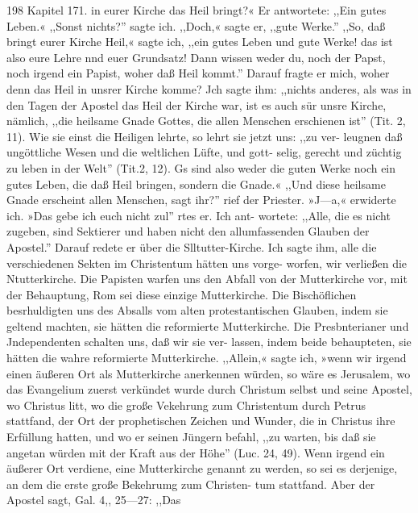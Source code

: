 198 Kapitel 171.
in eurer Kirche das Heil bringt?« Er antwortete: ,,Ein gutes
Leben.« ,,Sonst nichts?'' sagte ich. ,,Doch,« sagte er, ,,gute
Werke.'' ,,So, daß bringt eurer Kirche Heil,« sagte ich, ,,ein
gutes Leben und gute Werke! das ist also eure Lehre nnd euer
Grundsatz! Dann wissen weder du, noch der Papst, noch irgend
ein Papist, woher daß Heil kommt.'' Darauf fragte er mich,
woher denn das Heil in unsrer Kirche komme? Jch sagte ihm:
,,nichts anderes, als was in den Tagen der Apostel das Heil der
Kirche war, ist es auch sür unsre Kirche, nämlich, ,,die heilsame
Gnade Gottes, die allen Menschen erschienen ist'' (Tit. 2, 11).
Wie sie einst die Heiligen lehrte, so lehrt sie jetzt uns: ,,zu ver-
leugnen daß ungöttliche Wesen und die weltlichen Lüfte, und gott-
selig, gerecht und züchtig zu leben in der Welt'' (Tit.2, 12). Gs
sind also weder die guten Werke noch ein gutes Leben, die daß
Heil bringen, sondern die Gnade.« ,,Und diese heilsame Gnade
erscheint allen Menschen, sagt ihr?'' rief der Priester. »J—a,«
erwiderte ich. »Das gebe ich euch nicht zul'' rtes er. Ich ant-
wortete: ,,Alle, die es nicht zugeben, sind Sektierer und haben
nicht den allumfassenden Glauben der Apostel.''
Darauf redete er über die Slltutter-Kirche. Ich sagte ihm,
alle die verschiedenen Sekten im Christentum hätten uns vorge-
worfen, wir verließen die Ntutterkirche. Die Papisten warfen
uns den Abfall von der Mutterkirche vor, mit der Behauptung,
Rom sei diese einzige Mutterkirche. Die Bischöflichen besrhuldigten
uns des Absalls vom alten protestantischen Glauben, indem sie
geltend machten, sie hätten die reformierte Mutterkirche. Die
Presbnterianer und Jndependenten schalten uns, daß wir sie ver-
lassen, indem beide behaupteten, sie hätten die wahre reformierte
Mutterkirche. ,,Allein,« sagte ich, »wenn wir irgend einen äußeren
Ort als Mutterkirche anerkennen würden, so wäre es Jerusalem,
wo das Evangelium zuerst verkündet wurde durch Christum selbst
und seine Apostel, wo Christus litt, wo die große Vekehrung
zum Christentum durch Petrus stattfand, der Ort der prophetischen
Zeichen und Wunder, die in Christus ihre Erfüllung hatten, und
wo er seinen Jüngern befahl, ,,zu warten, bis daß sie angetan
würden mit der Kraft aus der Höhe'' (Luc. 24, 49). Wenn irgend ein
äußerer Ort verdiene, eine Mutterkirche genannt zu werden, so
sei es derjenige, an dem die erste große Bekehrumg zum Christen-
tum stattfand. Aber der Apostel sagt, Gal. 4,, 25—27: ,,Das


